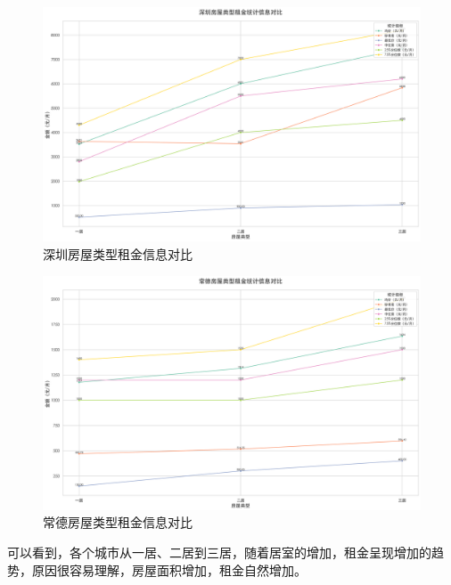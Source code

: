 \begin{figure}[htbp]
    \centering
    \includegraphics[width=0.7\linewidth]{../../figure/sz_room_price_line_chart.png}
    \caption{深圳房屋类型租金信息对比}
    \label{fig:sz_room_price_line_chart}
\end{figure}
\begin{figure}[htbp]
    \centering
    \includegraphics[width=0.7\linewidth]{../../figure/changde_room_price_line_chart.png}
    \caption{常德房屋类型租金信息对比}
    \label{fig:changde_room_price_line_chart}
\end{figure}

可以看到，各个城市从一居、二居到三居，随着居室的增加，租金呈现增加的趋势，原因很容易理解，房屋面积增加，租金自然增加。

